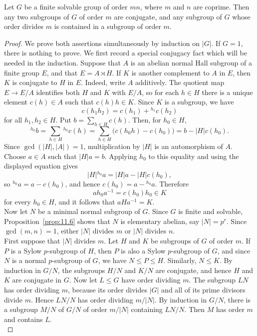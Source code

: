 \documentclass[../Odyssey_Project.tex]{subfiles}
\begin{document}
\begin{theorem}
\label{thm:11.9}
Let $G$ be a finite solvable group of order $mn$, where $m$ and $n$ are coprime. Then any two subgroups of $G$ of order $m$ are conjugate, and any subgroup of $G$ whose order divides $m$ is contained in a subgroup of order $m$.
\end{theorem}
\begin{proof}
    We prove both assertions simultaneously by induction on $\lvert G\rvert$. If $G=1$, there is nothing to prove. We first record a special conjugacy fact which will be needed in the induction. Suppose that $A$ is an abelian normal Hall subgroup of a finite group $E$, and that $E=A\rtimes H$. If $K$ is another complement to $A$ in $E$, then $K$ is conjugate to $H$ in $E$. Indeed, write $A$ additively. The quotient map $E\to E/A$ identifies both $H$ and $K$ with $E/A$, so for each $h\in H$ there is a unique element $c(h)\in A$ such that $c(h)h\in K$. Since $K$ is a subgroup, we have
    \[
        c(h_1h_2)=c(h_1)+{}^{h_1}c(h_2)
    \]
    for all $h_1,h_2\in H$. Put $b=\sum_{h\in H}c(h)$. Then, for $h_0\in H$,
    \[
        {}^{h_0}b
        =\sum_{h\in H}{}^{h_0}c(h)
        =\sum_{h\in H}\bigl(c(h_0h)-c(h_0)\bigr)
        =b-\lvert H\rvert c(h_0).
    \]
    Since $\gcd(\lvert H\rvert,\lvert A\rvert)=1$, multiplication by $\lvert H\rvert$ is an automorphism of $A$. Choose $a\in A$ such that $\lvert H\rvert a=b$. Applying $h_0$ to this equality and using the displayed equation gives
    \[
        \lvert H\rvert{}^{h_0}a=\lvert H\rvert a-\lvert H\rvert c(h_0),
    \]
    so ${}^{h_0}a=a-c(h_0)$, and hence $c(h_0)=a-{}^{h_0}a$. Therefore
    \[
        ah_0a^{-1}=c(h_0)h_0\in K
    \]
    for every $h_0\in H$, and it follows that $aHa^{-1}=K$.\\
    Now let $N$ be a minimal normal subgroup of $G$. Since $G$ is finite and solvable, Proposition~\ref{prop:11.6} shows that $N$ is elementary abelian, say $\lvert N\rvert=p^r$. Since $\gcd(m,n)=1$, either $\lvert N\rvert$ divides $m$ or $\lvert N\rvert$ divides $n$.\\
    First suppose that $\lvert N\rvert$ divides $m$. Let $H$ and $K$ be subgroups of $G$ of order $m$. If $P$ is a Sylow $p$-subgroup of $H$, then $P$ is also a Sylow $p$-subgroup of $G$, and since $N$ is a normal $p$-subgroup of $G$, we have $N\leq P\leq H$. Similarly, $N\leq K$. By induction in $G/N$, the subgroups $H/N$ and $K/N$ are conjugate, and hence $H$ and $K$ are conjugate in $G$. Now let $L\leq G$ have order dividing $m$. The subgroup $LN$ has order dividing $m$, because its order divides $\lvert G\rvert$ and all of its prime divisors divide $m$. Hence $LN/N$ has order dividing $m/\lvert N\rvert$. By induction in $G/N$, there is a subgroup $M/N$ of $G/N$ of order $m/\lvert N\rvert$ containing $LN/N$. Then $M$ has order $m$ and contains $L$.\\

\end{proof}
\end{document}
